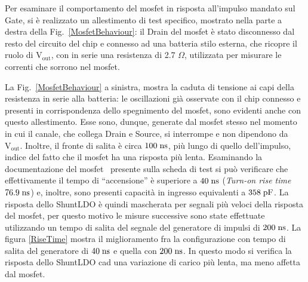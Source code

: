 Per esaminare il comportamento del mosfet in risposta all'impulso mandato sul Gate, si è realizzato un allestimento di test specifico, mostrato nella parte a destra della Fig.~\ref{MosfetBehaviour}: il Drain del mosfet è stato disconnesso dal resto del circuito del chip e connesso ad una batteria stilo esterna, che ricopre il ruolo di $\mathrm{V_{out}}$, con in serie una resistenza di 2.7 $\Omega$, utilizzata per misurare le correnti che sorrono nel mosfet.

La Fig.~\ref{MosfetBehaviour} a sinistra, mostra la caduta di tensione ai capi della resistenza in serie alla batteria: le oscillazioni già osservate con il chip connesso e presenti in corrispondenza dello spegnimento del mosfet, sono evidenti anche con questo allestimento.
Esse sono, dunque, generate dal mosfet stesso nel momento in cui il canale, che collega Drain e Source, si interrompe e non dipendono da $\mathrm{V_{out}}$.
Inoltre, il fronte di salita è circa $100 \rm \; ns$, più lungo di quello dell'impulso, indice del fatto che il mosfet ha una risposta più lenta. %
Esaminando la documentazione del mosfet~\cite{MOSFET} presente sulla scheda di test 
si può verificare che effettivamente il tempo di ``accensione'' è superiore a $40 \rm \; ns$ (\textit{Turn-on rise time} $76.9 \rm \; ns$) e, inoltre, sono presenti capacità in ingresso equivalenti a $358\rm \; pF$.
La risposta dello ShuntLDO è quindi mascherata per segnali più veloci della risposta del mosfet, per questo motivo le misure successive sono state effettuate utilizzando un tempo di salita del segnale del generatore di impulsi di $200 \rm \; ns$.
La figura \ref{RiseTime} mostra il miglioramento fra la configurazione con tempo di salita del generatore di $40 \rm \; ns$ e quella con $200 \rm \; ns$.
In questo modo si verifica la risposta dello ShuntLDO cad una variazione di carico più lenta, ma meno affetta dal mosfet.

